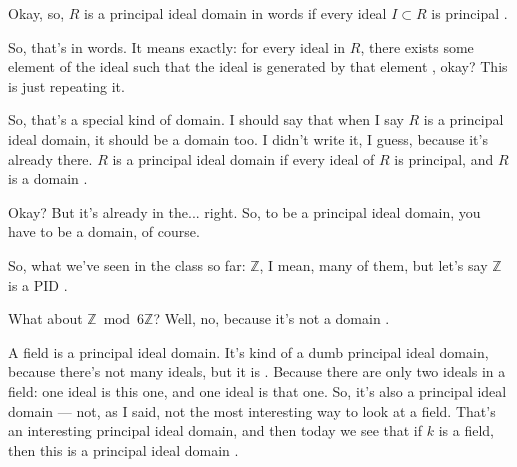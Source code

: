 \begin{speech}[00:37:40 - 00:39:52]
Okay, so, $R$ is a principal ideal domain in words if every ideal $I \subset R$ is principal .

So, that's in words. It means exactly: for every ideal in $R$, there exists some element of the ideal such that the ideal is generated by that element , okay? This is just repeating it.

So, that's a special kind of domain. I should say that when I say $R$ is a principal ideal domain, it should be a domain too. I didn't write it, I guess, because it's already there. $R$ is a principal ideal domain if every ideal of $R$ is principal, and $R$ is a domain .

Okay? But it's already in the... right. So, to be a principal ideal domain, you have to be a domain, of course.

So, what we've seen in the class so far: $\mathbb{Z}$, I mean, many of them, but let's say $\mathbb{Z}$ is a PID .

What about $\mathbb{Z} \bmod 6\mathbb{Z}$?  Well, no, because it's not a domain .

A field is a principal ideal domain. It's kind of a dumb principal ideal domain, because there's not many ideals, but it is . Because there are only two ideals in a field: one ideal is this one, and one ideal is that one. So, it's also a principal ideal domain --- not, as I said, not the most interesting way to look at a field. That's an interesting principal ideal domain, and then today we see that if $k$ is a field, then this is a principal ideal domain .
\end{speech}

\begin{hidden}
\end{hidden}

